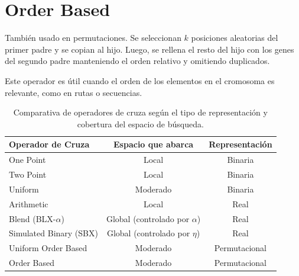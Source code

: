 \section{Order Based}

También usado en permutaciones. Se seleccionan $k$ posiciones aleatorias del primer padre y se copian al hijo. Luego, se rellena el resto del hijo con los genes del segundo padre manteniendo el orden relativo y omitiendo duplicados.

Este operador es útil cuando el orden de los elementos en el cromosoma es relevante, como en rutas o secuencias.

\begin{table}[H]
	\centering
	\begin{tabular}{|l|c|c|}
		\hline
		\textbf{Operador de Cruza} & \textbf{Espacio que abarca} & \textbf{Representación}  \\ \hline
		One Point                  & Local                        & Binaria             \\ \hline
		Two Point                 & Local                        & Binaria             \\ \hline
		Uniform                   & Moderado                     & Binaria       \\ \hline
		Arithmetic                & Local                        & Real                 \\ \hline
		Blend (BLX-$\alpha$)       & Global (controlado por $\alpha$) & Real\\ \hline
		Simulated Binary (SBX)     & Global (controlado por $\eta$) & Real   \\ \hline
		Uniform Order Based       & Moderado                     & Permutacional    \\ \hline
		Order Based               & Moderado                     & Permutacional           \\ \hline
	\end{tabular}
	\caption{Comparativa de operadores de cruza según el tipo de representación y cobertura del espacio de búsqueda.}
	\label{tab:cross_comparison}
\end{table}

